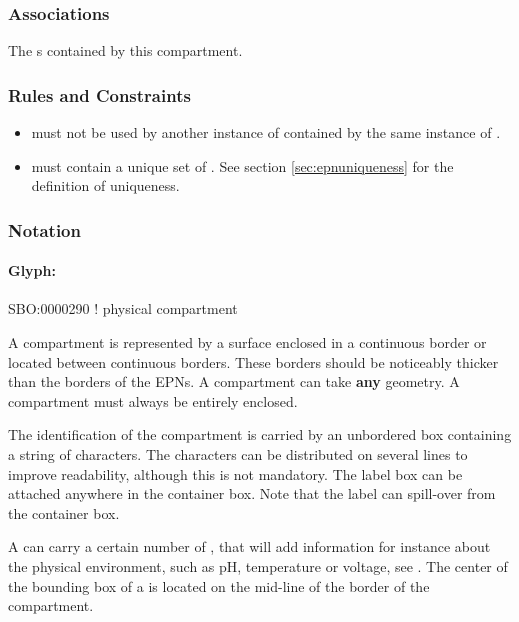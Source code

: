 \subsubsection{Associations}

\begin{attributes}
   The
  s contained by this compartment.
\end{attributes}

\subsubsection{Rules and Constraints}

\begin{itemize}
\item {} must not be used by another instance of
   contained by the same instance of
  .
\item {} must contain a unique set of
  . See section \ref{sec:epnuniqueness} for
  the definition of  uniqueness.
\end{itemize}

\subsubsection{Notation}

\paragraph{Glyph: }\label{sec:compartment}

\begin{glyphDescription}

\glyphSboTerm  SBO:0000290 ! physical compartment 

\glyphContainer A compartment is represented by a surface enclosed in a continuous border or located between continuous borders. These borders should be noticeably thicker than the borders of the EPNs. A compartment can take \textbf{any} geometry. A compartment must always be entirely enclosed.

\glyphLabel The identification of the compartment is carried by an unbordered box containing a string of characters. The characters can be distributed on several lines to improve readability, although this is not mandatory. The label box can be attached anywhere in the container box. Note that the label can spill-over from the container box.

\glyphAux A  can carry a certain number of , that will add information for instance about the physical environment, such as pH, temperature or voltage, see .  The center of the bounding box of a  is located on the mid-line of the border of the compartment.

\end{glyphDescription}

